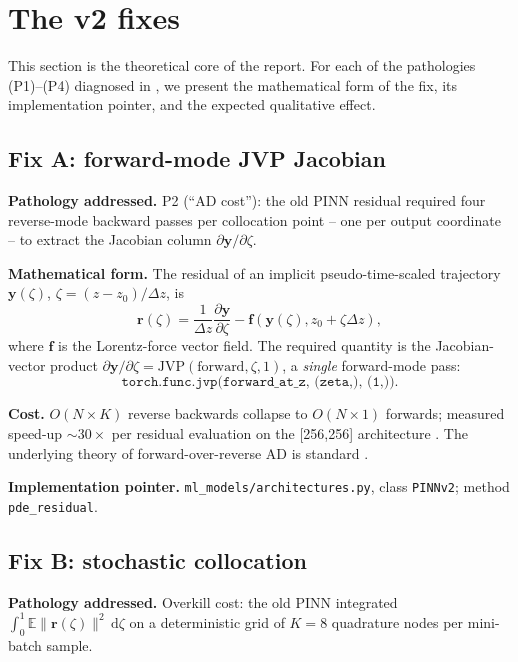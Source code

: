 \documentclass[a4paper,11pt]{article}
\newcommand{\dz}{\Delta z}
\newcommand{\state}{\mathbf{y}}
\begin{document}
\section{The v2 fixes}\label{gen2new:sec:fixes}

This section is the theoretical core of the report. For each of the
pathologies (P1)--(P4) diagnosed in \cite{gen2oldreport}, we present
the mathematical form of the fix, its implementation pointer, and the
expected qualitative effect.

\subsection{Fix A: forward-mode JVP Jacobian}

\textbf{Pathology addressed.} P2 (``AD cost''): the old PINN residual
required four reverse-mode backward passes per collocation point --
one per output coordinate -- to extract the Jacobian column
$\partial\state/\partial\zeta$.

\textbf{Mathematical form.} The residual of an implicit
pseudo-time-scaled trajectory $\state(\zeta)$,
$\zeta=(z-z_0)/\dz$, is
\begin{equation}
\mathbf{r}(\zeta)=\frac{1}{\dz}\frac{\partial\state}{\partial\zeta}
-\mathbf{f}(\state(\zeta),z_0+\zeta\dz),
\label{eq:residual}
\end{equation}
where $\mathbf{f}$ is the Lorentz-force vector field. The required
quantity is the Jacobian-vector product
$\partial\state/\partial\zeta=\mathrm{JVP}(\text{forward},\zeta,1)$, a
\emph{single} forward-mode pass:
\[
\texttt{torch.func.jvp(forward\_at\_z,\ (zeta,),\ (1,))}.
\]

\textbf{Cost.} $O(N\times K)$ reverse backwards collapse to
$O(N\times 1)$ forwards; measured speed-up ${\sim}30\times$ per
residual evaluation on the [256,256] architecture
\cite{functorch}. The underlying theory of forward-over-reverse AD is
standard \cite{GriewankWalther2008}.

\textbf{Implementation pointer.}
\texttt{ml\_models/architectures.py}, class \texttt{PINNv2}; method
\texttt{pde\_residual}.

\subsection{Fix B: stochastic collocation}

\textbf{Pathology addressed.} Overkill cost: the old PINN integrated
$\int_0^1\mathbb{E}\|\mathbf{r}(\zeta)\|^2\,\mathrm{d}\zeta$ on a
deterministic grid of $K=8$ quadrature nodes per mini-batch sample.
\end{document}

